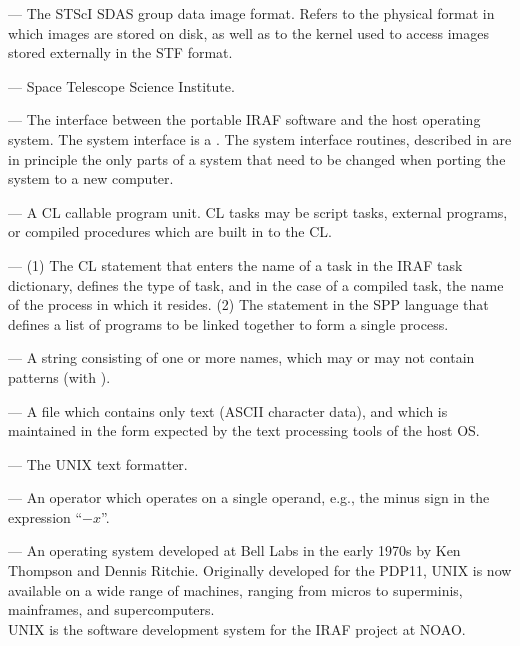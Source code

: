\medskip \noindent {} --- The STScI SDAS group data image format.
Refers to the physical format in which images are stored on disk, as well as
to the  kernel used to access images stored externally in the
STF format.

\medskip \noindent {} --- Space Telescope Science Institute.

\medskip \noindent {} --- The interface between 
the portable IRAF software and the host operating
system.  The system interface is a .
The system interface routines, described in 
are in principle the only parts of a system that need to be changed
when porting the system to a new computer.

\medskip \noindent {} --- A CL callable program unit.  
CL tasks may be script tasks, external programs,
or compiled procedures which are built in to the CL.

\medskip \noindent {} --- (1) The CL statement that
enters the name of a task in the IRAF task dictionary,
defines the type of task, and in the case of a compiled task, the name of
the process in which it resides.
(2) The statement in the SPP language that defines a list of programs
to be linked together to form a single process.

\medskip \noindent {} --- A string consisting of one or more
names, which may or may not contain patterns
(with ).

\medskip \noindent {} --- A file which contains only 
text (ASCII character data), and which is maintained
in the form expected by the text processing tools of the host OS.

\medskip \noindent {} --- The UNIX text formatter.

\medskip \noindent {} --- An operator which operates on
a single operand, e.g., the minus sign in the expression ``$-x$''.

\medskip \noindent {} --- An operating system developed at Bell
Labs in the early 1970s by Ken Thompson and Dennis Ritchie. Originally
developed for the PDP11, UNIX is now available on a wide range of machines,
ranging from micros to superminis, mainframes, and supercomputers.\\  
UNIX is the software development system for the IRAF project at NOAO.

